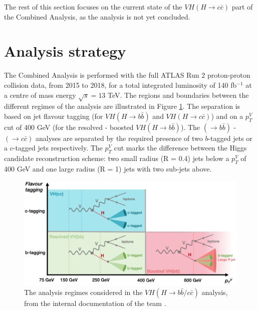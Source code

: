 The rest of this section focuses on the current state of the $VH (H\rightarrow c\bar{c})$ part of the Combined Analysis, as the analysis is not yet concluded. 

\section{Analysis strategy}
The Combined Analysis is performed with the full ATLAS Run 2 proton-proton collision data, from 2015 to 2018, for a total integrated luminosity of 140 fb$^{-1}$ at a centre of mass energy $\sqrt{s} = 13$ TeV. The regions and boundaries between the different regimes of the analysis are illustrated in Figure \ref{fig:ana-strat}. The separation is based on jet flavour tagging (for  $VH (H\rightarrow b\bar{b})$ and $VH (H\rightarrow c\bar{c})$) and on a $p_T^V$ cut of 400 GeV (for the resolved - boosted  $VH (H\rightarrow b\bar{b})$). The $(\rightarrow b\bar{b})$ - $(\rightarrow c\bar{c})$ analyses are separated by the required presence of two $b$-tagged jets or a $c$-tagged jets respectively. The $p_T^V$ cut marks the difference between the Higgs candidate reconstruction scheme: two small radius (R = 0.4) jets below a $p_T^V$ of 400 GeV and one large radius (R = 1) jets with two sub-jets above.

\begin{figure}[h!]
\center
\includegraphics[scale=0.35]{Images/VH/AnalysisRegime.png}
\caption{The analysis regimes considered in the $VH (H\rightarrow b\bar{b}/c\bar{c})$ analysis, from the internal documentation of the team \cite{Chisholm:2743096}.} 
\label{fig:ana-strat}
\end{figure}

